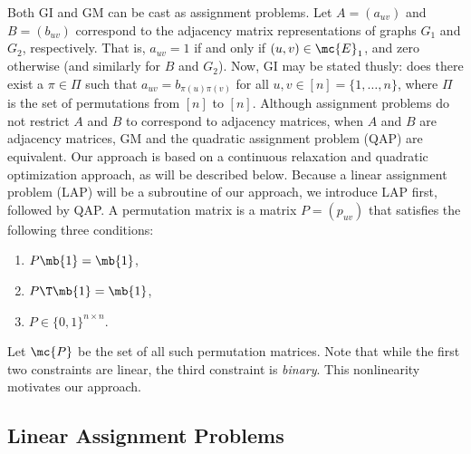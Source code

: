 \documentclass[10pt,journal,cspaper,compsoc]{IEEEtran}
\begin{document}
Both GI and GM can be cast as assignment problems.  Let $A=(a_{uv})$ and $B=(b_{uv})$ correspond to the adjacency matrix representations of graphs $G_1$ and $G_2$, respectively.  That is, $a_{uv}=1$ if and only if $(u,v) \in \mc{E}_1$, and zero otherwise (and similarly for $B$ and $G_2$). Now, GI may be stated thusly:  does there exist a $\pi \in \Pi$ such that $a_{uv}=b_{\pi(u)\pi(v)}$ for all $u,v \in [n]=\{1,\ldots, n\}$, where $\Pi$ is the set of permutations from $[n]$ to $[n]$.  Although assignment problems do not restrict $A$ and $B$ to correspond to adjacency matrices, when $A$ and $B$ are adjacency matrices, GM and the quadratic assignment problem (QAP) are equivalent.  Our approach is based on a continuous relaxation and quadratic optimization approach, as will be described below.  Because a linear assignment problem (LAP) will be a subroutine of our approach, we introduce LAP first, followed by QAP.   A permutation matrix is a matrix $P=(p_{uv})$ that satisfies the following three conditions:
\begin{enumerate}
\item	$P\mb{1} = \mb{1}$,
\item	$P\T \mb{1}=\mb{1}$, %
\item 	$P \in  \{0,1\}^{n \times n}$.	
\end{enumerate}
Let $\mc{P}$ be the set of all such permutation matrices. Note that while the first two constraints are linear, the third constraint is \emph{binary}.  This nonlinearity motivates our approach.






\subsection{Linear Assignment Problems} %
\label{ssub:linear_assignment_problems}

\end{document}
